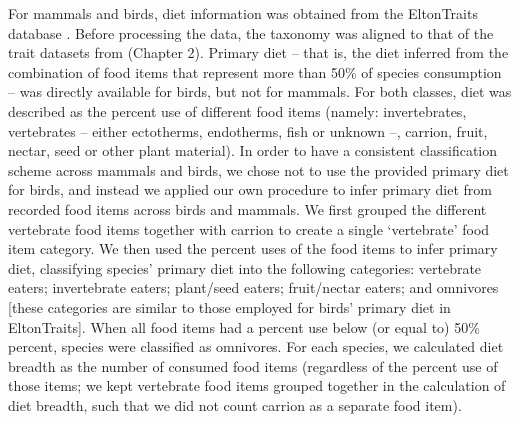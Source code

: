 \documentclass[11pt]{article}
\begin{document}

For mammals and birds, diet information was obtained from the EltonTraits database \citep{Wilman2014}. Before processing the data, the taxonomy was aligned to that of the trait datasets from \citet{Etard2020} (Chapter 2). Primary diet -- that is, the diet inferred from the combination of food items that represent more than 50\% of species consumption -- was directly available for birds, but not for mammals. For both classes, diet was described as the percent use of different food items (namely: invertebrates, vertebrates -- either ectotherms, endotherms, fish or unknown --, carrion, fruit, nectar, seed or other plant material). In order to have a consistent classification scheme across mammals and birds, we chose not to use the provided primary diet for birds, and instead we applied our own procedure to infer primary diet from recorded food items across birds and mammals. We first grouped the different vertebrate food items together with carrion to create a single `vertebrate' food item category. We then used the percent uses of the food items to infer primary diet, classifying species’ primary diet into the following categories: vertebrate eaters; invertebrate eaters; plant/seed eaters; fruit/nectar eaters; and omnivores [these categories are similar to those employed for birds' primary diet in EltonTraits]. When all food items had a percent use below (or equal to) 50\% percent, species were classified as omnivores. %
 For each species, we calculated diet breadth as the number of consumed food items (regardless of the percent use of those items; we kept vertebrate food items grouped together in the calculation of diet breadth, such that we did not count carrion as a separate food item). %
\end{document}
